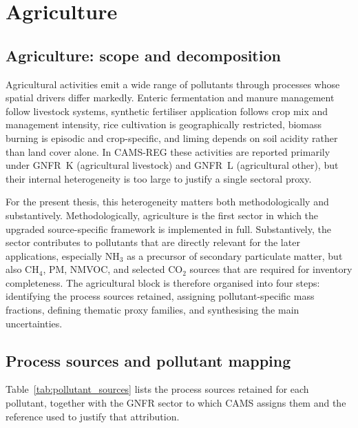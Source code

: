 \section{Agriculture}
\label{sec:agriculture}

\subsection{Agriculture: scope and decomposition}

Agricultural activities emit a wide range of pollutants through
processes whose spatial drivers differ markedly. Enteric fermentation
and manure management follow livestock systems, synthetic fertiliser
application follows crop mix and management intensity, rice cultivation
is geographically restricted, biomass burning is episodic and
crop-specific, and liming depends on soil acidity rather than land
cover alone. In CAMS-REG these activities are reported primarily under
GNFR~K (agricultural livestock) and GNFR~L (agricultural other), but
their internal heterogeneity is too large to justify a single sectoral
proxy.

For the present thesis, this heterogeneity matters both methodologically
and substantively. Methodologically, agriculture is the first sector in
which the upgraded source-specific framework is implemented in full.
Substantively, the sector contributes to pollutants that are directly
relevant for the later applications, especially NH$_3$ as a precursor
of secondary particulate matter, but also CH$_4$, PM, NMVOC, and
selected CO$_2$ sources that are required for inventory completeness.
The agricultural block is therefore organised into four steps:
identifying the process sources retained, assigning pollutant-specific
mass fractions, defining thematic proxy families, and synthesising the
main uncertainties.

\subsection{Process sources and pollutant mapping}

Table~\ref{tab:pollutant_sources} lists the process sources retained
for each pollutant, together with the GNFR sector to which CAMS assigns
them and the reference used to justify that attribution.

